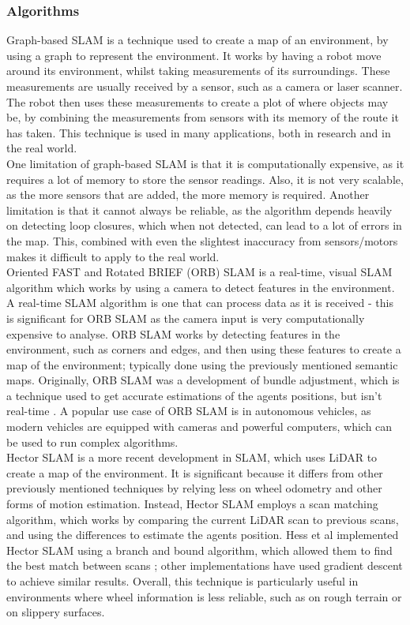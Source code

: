 \documentclass[12pt]{article}
\begin{document}
\subsubsection{Algorithms}
Graph-based SLAM is a technique used to create a map of an environment, by using a graph to represent the environment. It
works by having a robot move around its environment, whilst taking measurements of its surroundings. These measurements
are usually received by a sensor, such as a camera or laser scanner. The robot then uses these measurements to create a
plot of where objects may be, by combining the measurements from sensors with its memory of the route it has taken. This
technique is used in many applications, both in research and in the real world.\\
One limitation of graph-based SLAM is that it is computationally expensive, as it requires a lot of memory to store the
sensor readings. Also, it is not very scalable, as the more sensors that are added, the more memory is required. Another
limitation is that it cannot always be reliable, as the algorithm depends heavily on detecting loop closures, which when
not detected, can lead to a lot of errors in the map. This, combined with even the slightest inaccuracy from sensors/motors
makes it difficult to apply to the real world.\\
Oriented FAST and Rotated BRIEF (ORB) SLAM is a real-time, visual SLAM algorithm which works by using a camera to detect features
in the environment. A real-time SLAM algorithm is one that can process data as it is received - this is significant for ORB SLAM
as the camera input is very computationally expensive to analyse. ORB SLAM works by detecting features in the environment, such
as corners and edges, and then using these features to create a map of the environment; typically done using the previously
mentioned semantic maps. Originally, ORB SLAM was a development of bundle adjustment, which is a technique used to get accurate
estimations of the agents positions, but isn't real-time \cite{ORB_SLAM}. A popular use case of ORB SLAM is in autonomous vehicles,
as modern vehicles are equipped with cameras and powerful computers, which can be used to run complex algorithms.\\
Hector SLAM is a more recent development in SLAM, which uses LiDAR to create a map of the environment. It is significant because it
differs from other previously mentioned techniques by relying less on wheel odometry and other forms of motion estimation. Instead,
Hector SLAM employs a scan matching algorithm, which works by comparing the current LiDAR scan to previous scans, and using the
differences to estimate the agents position. Hess et al implemented Hector SLAM using a branch and bound algorithm, which allowed
them to find the best match between scans \cite{Hector_SLAM}; other implementations have used gradient descent to achieve similar
results. Overall, this technique is particularly useful in environments where wheel information is less reliable, such as on rough terrain
or on slippery surfaces. \\
\end{document}

